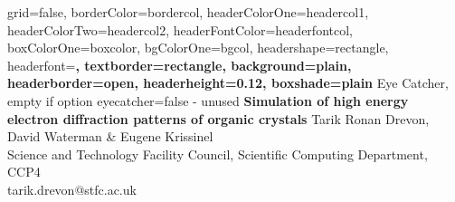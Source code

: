 \documentclass[a0paper,portrait,fontscale=0.34]{baposter}
\begin{document}




\begin{poster}{
	grid=false,
	borderColor=bordercol,
	headerColorOne=headercol1,
	headerColorTwo=headercol2,
	headerFontColor=headerfontcol,
	boxColorOne=boxcolor,
	bgColorOne=bgcol,
	headershape=rectangle,
	headerfont=\Large\sf\bf,
	textborder=rectangle,
	background=plain,
	headerborder=open,
	headerheight=0.12\textheight,
  boxshade=plain
}
{
	Eye Catcher, empty if option eyecatcher=false - unused
}
{\sf\bf
	Simulation of high energy electron diffraction patterns of organic crystals
}
{
	\vspace{1em} Tarik Ronan Drevon, David Waterman \& Eugene Krissinel\\
	{\smaller Science and Technology Facility Council, Scientific Computing Department, CCP4}\\
	{\smaller	tarik.drevon@stfc.ac.uk}
}
{
	\setlength\fboxsep{0pt}
	\setlength\fboxrule{0.75pt}
}




\end{poster}
\end{document}
